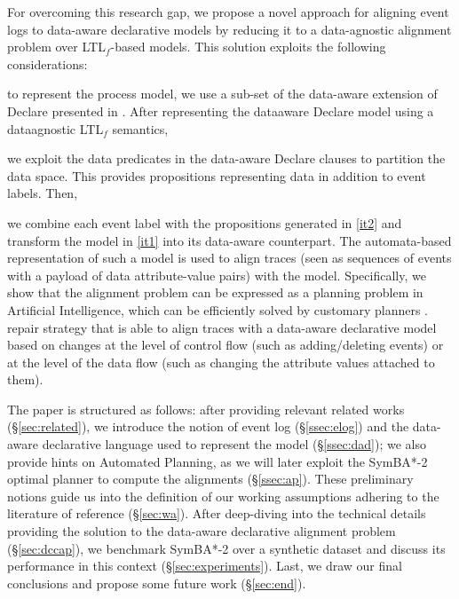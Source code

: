 For overcoming this research gap, we propose a novel approach for aligning event logs to data-aware declarative models by reducing it to a data-agnostic alignment problem over LTL$_f$-based models. This solution exploits the following considerations: \begin{enumerate*}[label=\emph{\alph*})]
	\item \label{it1} to represent the process model, we use a sub-set of the data-aware extension of Declare presented in \cite{BurattinMS16}. After representing the data\-aware Declare model using a data\added{-}agnostic LTL$_f$ semantics,
	\item \label{it2} we exploit the data predicates in the data-aware Declare clauses to partition the data space. This provides propositions representing data in addition to event labels. Then,
	\item we combine each event label with the propositions generated in \ref{it2} and transform the model in \ref{it1} into its data-aware counterpart. The automata-based representation of such a model is used to align traces (seen as sequences of events with a payload of data attribute-value pairs) with the model. Specifically, we show that the alignment problem can  be expressed as a planning problem in Artificial Intelligence, which can be efficiently solved by customary planners \cite{XuLZ17a,LeoniM17}.
%
 repair strategy that is able to align traces with a data-aware declarative model based on changes at the level of control flow (such as adding/deleting events) or at the level of the data flow (such as changing the attribute values attached to them).
\end{enumerate*}

The paper is structured as follows: after providing relevant related works (\S\ref{sec:related}), we introduce the notion of event log (\S\ref{ssec:elog}) and the data-aware declarative language used to represent the model (\S\ref{ssec:dad}); we also provide hints on Automated Planning, as we will later exploit the SymBA*-2 optimal planner to compute the alignments (\S\ref{ssec:ap}). These preliminary notions guide us into the definition of our  working assumptions adhering to the literature of reference (\S\ref{sec:wa}). After deep-diving into the technical details providing the solution to the data-aware declarative alignment problem (\S\ref{sec:dccap}), we benchmark SymBA*-2 over a synthetic dataset and discuss its performance in this context (\S\ref{sec:experiments}). Last, we draw our final conclusions and propose some future work (\S\ref{sec:end}).



